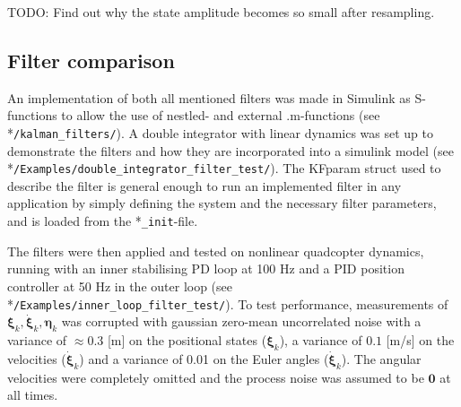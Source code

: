 \documentclass{article}
\begin{document}
TODO: Find out why the state amplitude becomes so small after resampling.

\subsection{Filter comparison}
An implementation of both all mentioned filters was made in Simulink as S-functions to allow the use of nestled- and external .m-functions (see *\texttt{/kalman\_filters/}). A double integrator with linear dynamics was set up to demonstrate the filters and how they are incorporated into a simulink model (see *\texttt{/Examples/double\_integrator\_filter\_test/}). The KFparam struct used to describe the filter is general enough to run an implemented filter in any application by simply defining the system and the necessary filter parameters, and is loaded from the *\texttt{\_init}-file. 

The filters were then applied and tested on nonlinear quadcopter dynamics, running with an inner stabilising PD loop at 100 Hz and a PID position controller at 50 Hz in the outer loop (see *\texttt{/Examples/inner\_loop\_filter\_test/}). To test performance, measurements of $\boldsymbol\xi_k, \dot{\boldsymbol\xi}_k, \boldsymbol\eta_k$ was corrupted with gaussian zero-mean uncorrelated noise with a variance of $\approx 0.3$ [m] on the positional states ($\boldsymbol\xi_k$), a variance of $0.1$ [m/s] on the velocities ($\dot{\boldsymbol\xi}_k$) and a variance of 0.01 on the Euler angles ($\dot{\boldsymbol\xi}_k$). The angular velocities were completely omitted and the process noise was assumed to be $\mathbf{0}$ at all times.
\end{document}
